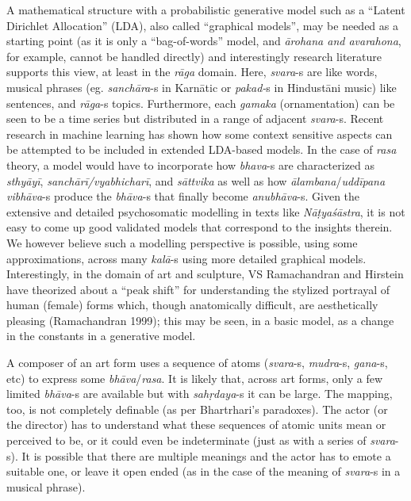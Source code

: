 A mathematical structure with a probabilistic generative model such as a “Latent Dirichlet Allocation” (LDA), also called “graphical models”, may be needed as a starting point (as it is only a “bag-of-words” model, and \textsl{ārohana and avarahona}, for example, cannot be handled directly) and interestingly research literature supports this view, at least in the \textsl{rāga} domain. Here, \textsl{svara}-s are like words, musical phrases (eg. \textsl{sanchāra}-s in Karnātic or \textsl{pakad-}s in Hindustāni music) like sentences, and \textsl{rāga}-s topics. Furthermore, each \textsl{gamaka} (ornamentation) can be seen to be a time series but distributed in a range of adjacent \textsl{svara}-s. Recent research in machine learning has shown how some context sensitive aspects can be attempted to be included in extended LDA-based models. In the case of \textsl{rasa} theory, a model would have to incorporate how \textsl{bhava}-s are characterized as \textsl{sthyāyī}, \textsl{sanchārī/vyabhicharī}, and \textsl{sāttvika} as well as how \textsl{ālambana}/\textsl{uddīpana vibhāva}-s produce the \textsl{bhāva}-s that finally become \textsl{anubhāva}-s. Given the extensive and detailed psychosomatic modelling in texts like \textsl{Nāṭyaśāstra}, it is not easy to come up good validated models that correspond to the insights therein. We however believe such a modelling perspective is possible, using some approximations, across many \textsl{kalā}-s using more detailed graphical models. Interestingly, in the domain of art and sculpture, VS Ramachandran and Hirstein have theorized about a “peak shift” for understanding the stylized portrayal of human (female) forms which, though anatomically difficult, are aesthetically pleasing (Ramachandran 1999); this may be seen, in a basic model, as a change in the constants in a generative model.

A composer of an art form uses a sequence of atoms (\textsl{svara}-s, \textsl{mudra}-s, \textsl{gana}-s, etc) to express some \textsl{bhāva}/\textsl{rasa}. It is likely that, across art forms, only a few limited \textsl{bhāva}-s are available but with \textsl{sahṛdaya}-s it can be large. The mapping, too, is not completely definable (as per Bhartrhari’s paradoxes). The actor (or the director) has to understand what these sequences of atomic units mean or perceived to be, or it could even be indeterminate (just as with a series of \textsl{svara}-s). It is possible that there are multiple meanings and the actor has to emote a suitable one, or leave it open ended (as in the case of the meaning of \textsl{svara}-s in a musical phrase).

